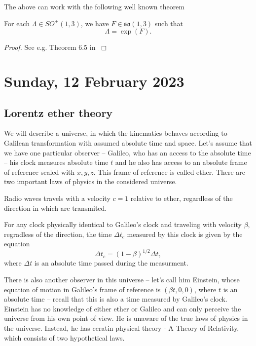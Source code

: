 \documentclass[main.tex]{subfiles}
\begin{document}
The above can work with the following well known theorem
\begin{theorem}
For each $\Lambda\in SO^{+}(1, 3)$, we have $F\in \mathfrak{so}(1,3)$ such that
\begin{equation}
\Lambda = \exp(F).
\end{equation}
\end{theorem}
\begin{proof}
See e.g. Theorem 6.5 in \cite{hall2004}
\end{proof}

\section{Sunday, 12 February 2023}

\subsection{Lorentz ether theory}

We will describe a universe, in which the kinematics behaves according to Galilean transformation with assumed absolute time and space. Let's assume that we have one particular observer -- Galileo, who has an access to the absolute time -- his clock measures absolute time $t$ and he also has access to an absolute frame of reference scaled with $x, y, z$. This frame of reference is called ether. There are two important laws of physics in the considered universe.

\begin{law}
Radio waves travels with a velocity $c = 1$ relative to ether, regardless of the direction in which are transmited.
\end{law}

\begin{law}
\label{law-of-time-dilatation}
For any clock physically identical to Galileo's clock and traveling with velocity $\beta$, regradless of the direction, the time $\Delta t_c$ measured by this clock is given by the equation
\begin{equation}
\Delta t_c = (1 - \beta)^{1/2}\Delta t,
\end{equation} 
where $\Delta t$ is an absolute time passed during the measurment.
\end{law} 

There is also another observer in this universe -- let's call him Einstein, whose equation of motion in Galileo's frame of reference is $(\beta t, 0, 0)$, where $t$ is an absolute time -- recall that this is also a time measured by Galileo's clock. Einstein has no knowledge of either ether or Galileo and can only perceive the universe from his own point of view. He is unaware of the true laws of physics in the universe. Instead, he has ceratin physical theory - A Theory of Relativity, which consists of two hypothetical laws.
\end{document}
